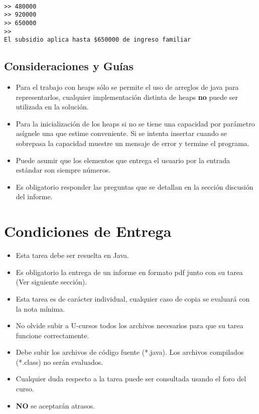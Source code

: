 \documentclass[dcc]{fcfmcourse}
\begin{document}
\texttt{ \\
>> 480000 \\
>> 920000 \\
>> 650000 \\
>> \\
El subsidio aplica hasta \$650000 de ingreso familiar
}

\newpage
\subsection{Consideraciones y Guías}

\begin{itemize}

\item Para el trabajo con heaps sólo se permite el uso de arreglos de java para representarlos, cualquier implementación distinta de heaps \textbf{no} puede ser utilizada en la solución.

\item Para la inicialización de los heaps si no se tiene una capacidad por parámetro asígnele una que estime conveniente. Si se intenta insertar cuando se sobrepasa la capacidad muestre un mensaje de error y termine el programa.

\item Puede asumir que los elementos que entrega el usuario por la entrada estándar son siempre números.

\item Es obligatorio responder las preguntas que se detallan en la sección discusión del informe. \\

\end{itemize}

\section{Condiciones de Entrega}

\begin{itemize}
    \item Esta tarea debe ser resuelta en Java.
    \item Es obligatorio la entrega de un informe en formato pdf junto con su tarea (Ver siguiente sección).
    \item Esta tarea es de carácter individual, cualquier caso de copia se evaluará con la nota mínima.
    \item No olvide subir a U-cursos todos los archivos necesarios para que su tarea funcione correctamente.
    \item Debe subir los archivos de código fuente (*.java). Los archivos compilados (*.class) no serán evaluados.
    \item Cualquier duda respecto a la tarea puede ser consultada usando el foro del curso.
    \item \textbf{NO} se aceptarán atrasos.
\end{itemize}
\end{document}
